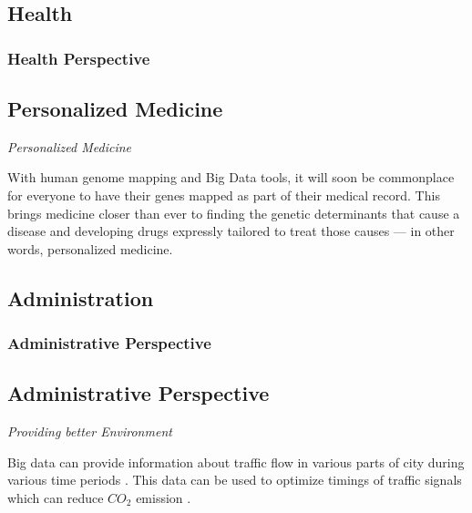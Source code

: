 \documentclass[12pt,xcolor=dvipsnames]{beamer}
\begin{document}
\subsection{Health}
\begin{frame}[t]
\frametitle{Health Perspective}

\begin{center}
\subsection{Personalized Medicine }
\begin{center}

\end{center}
\textit{Personalized Medicine}

\end{center}
\begin{center}


With human genome mapping and Big Data tools, it will soon be commonplace for everyone to have their genes mapped as part of their medical record. This brings medicine closer than ever to finding the genetic determinants that cause a disease and developing drugs expressly tailored to treat those causes — in other words, personalized medicine.
\end{center}

\end{frame}

\subsection{Administration}
\begin{frame}[t]
\frametitle{Administrative Perspective}

\begin{center}
\subsection{Administrative Perspective }




\textit{Providing better Environment}






Big data can provide information about traffic flow in various parts of city during various time periods .
This data can be used to optimize timings of traffic signals which can reduce $CO_2$ emission .



\end{center}
\end{frame}
\end{document}
